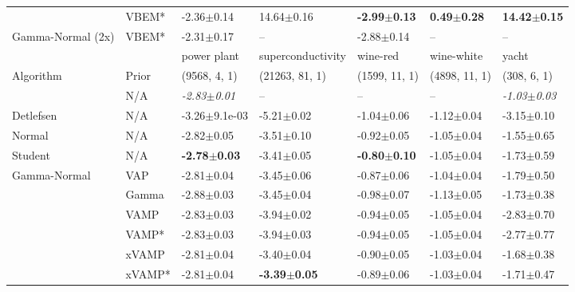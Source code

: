 \begin{tabular}{lllllll}
                  & VBEM* &           -2.36$\pm$0.14 &           14.64$\pm$0.16 &  \textbf{-2.99$\pm$0.13} &  \textbf{0.49$\pm$0.28} &  \textbf{14.42$\pm$0.15} \\
Gamma-Normal (2x) & VBEM* &           -2.31$\pm$0.17 &                      -- &           -2.88$\pm$0.14 &                     -- &                      -- \\
\midrule
                  &       &              power plant &        superconductivity &                 wine-red &               wine-white &                    yacht \\
Algorithm & Prior& (9568, 4, 1)& (21263, 81, 1)& (1599, 11, 1)& (4898, 11, 1)& (308, 6, 1)\\
\midrule
\citet{sun2019functional} & N/A &  \textit{-2.83$\pm$0.01} &                       -- &                       -- &                       -- &  \textit{-1.03$\pm$0.03} \\
Detlefsen & N/A &        -3.26$\pm$9.1e-03 &           -5.21$\pm$0.02 &           -1.04$\pm$0.06 &           -1.12$\pm$0.04 &           -3.15$\pm$0.10 \\
Normal & N/A &           -2.82$\pm$0.05 &           -3.51$\pm$0.10 &           -0.92$\pm$0.05 &           -1.05$\pm$0.04 &           -1.55$\pm$0.65 \\
Student & N/A &  \textbf{-2.78$\pm$0.03} &           -3.41$\pm$0.05 &  \textbf{-0.80$\pm$0.10} &           -1.05$\pm$0.04 &           -1.73$\pm$0.59 \\
Gamma-Normal & VAP &           -2.81$\pm$0.04 &           -3.45$\pm$0.06 &           -0.87$\pm$0.06 &           -1.04$\pm$0.04 &           -1.79$\pm$0.50 \\
                  & Gamma &           -2.88$\pm$0.03 &           -3.45$\pm$0.04 &           -0.98$\pm$0.07 &           -1.13$\pm$0.05 &           -1.73$\pm$0.38 \\
                  & VAMP &           -2.83$\pm$0.03 &           -3.94$\pm$0.02 &           -0.94$\pm$0.05 &           -1.05$\pm$0.04 &           -2.83$\pm$0.70 \\
                  & VAMP* &           -2.83$\pm$0.03 &           -3.94$\pm$0.03 &           -0.94$\pm$0.05 &           -1.05$\pm$0.04 &           -2.77$\pm$0.77 \\
                  & xVAMP &           -2.81$\pm$0.04 &           -3.40$\pm$0.04 &           -0.90$\pm$0.05 &           -1.03$\pm$0.04 &           -1.68$\pm$0.38 \\
                  & xVAMP* &           -2.81$\pm$0.04 &  \textbf{-3.39$\pm$0.05} &           -0.89$\pm$0.06 &           -1.03$\pm$0.04 &           -1.71$\pm$0.47 \\

\end{tabular}
